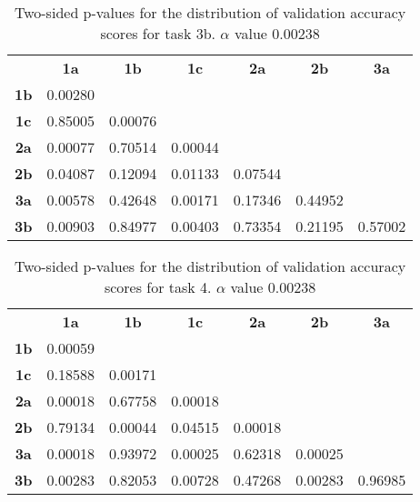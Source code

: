 \begin{table}[!ht]
    \centering
    \begin{tabular}{ccccccc}
                & \textbf{1a} & \textbf{1b} & \textbf{1c} & \textbf{2a}  & \textbf{2b}  & \textbf{3a}  \\
    \textbf{1b} & 0.00280 &         &         &         &         &         \\
    \textbf{1c} & 0.85005 & 0.00076 &         &         &         &         \\
    \textbf{2a} & 0.00077 & 0.70514 & 0.00044 &         &         &         \\
    \textbf{2b} & 0.04087 & 0.12094 & 0.01133 & 0.07544 &         &         \\
    \textbf{3a} & 0.00578 & 0.42648 & 0.00171 & 0.17346 & 0.44952 &         \\
    \textbf{3b} & 0.00903 & 0.84977 & 0.00403 & 0.73354 & 0.21195 & 0.57002
    \end{tabular}
    \caption[Experiment 2: p-table for validation accuracy (task 3b)]{Two-sided p-values for the distribution of validation accuracy scores for task 3b. \(\alpha\) value 0.00238}
    \label{tab:exp2.validation3b}
\end{table}

\begin{table}[!ht]
    \centering
    \begin{tabular}{ccccccc}
                & \textbf{1a} & \textbf{1b} & \textbf{1c} & \textbf{2a} & \textbf{2b} & \textbf{3a}  \\
    \textbf{1b} & 0.00059 &         &         &         &         &         \\
    \textbf{1c} & 0.18588 & 0.00171 &         &         &         &         \\
    \textbf{2a} & 0.00018 & 0.67758 & 0.00018 &         &         &         \\
    \textbf{2b} & 0.79134 & 0.00044 & 0.04515 & 0.00018 &         &         \\
    \textbf{3a} & 0.00018 & 0.93972 & 0.00025 & 0.62318 & 0.00025 &         \\
    \textbf{3b} & 0.00283 & 0.82053 & 0.00728 & 0.47268 & 0.00283 & 0.96985
    \end{tabular}
    \caption[Experiment 2: p-table for validation accuracy (task 4)]{Two-sided p-values for the distribution of validation accuracy scores for task 4. \(\alpha\) value 0.00238}
    \label{tab:exp2.validation4}
\end{table}

\newpage
